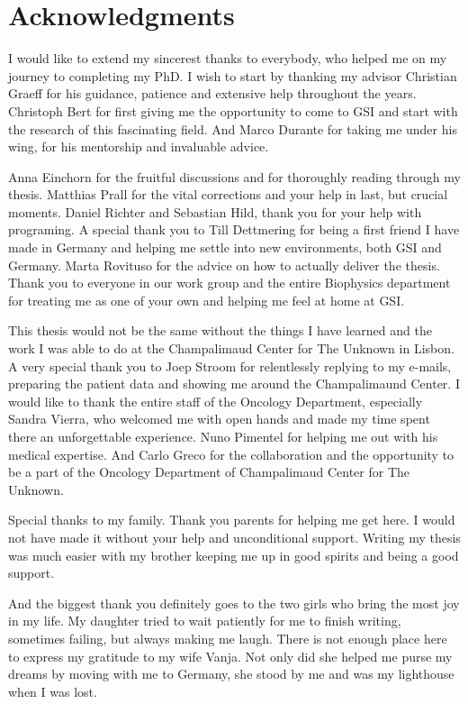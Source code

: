

\chapter*{Acknowledgments}

I would like to extend my sincerest thanks to everybody, who helped me on my journey to completing my PhD.
I wish to start by thanking my advisor Christian Graeff for his guidance, patience and extensive help throughout the years. 
Christoph Bert for first giving me the opportunity to come to GSI and start with the research of this fascinating field. And Marco Durante for taking me under his wing, for his mentorship and invaluable advice.  

Anna Einchorn for the fruitful discussions and for thoroughly reading through my thesis. Matthias Prall for the vital corrections and your help in last, but crucial moments. Daniel Richter and Sebastian Hild, thank you for your help with programing.
A special thank you to Till Dettmering for being a first friend I have made in Germany and helping me settle into new environments, both GSI and Germany. 
Marta Rovituso for the advice on how to actually deliver the thesis. 
Thank you to everyone in our work group and the entire Biophysics department for treating me as one of your own and helping me feel at home at GSI. 

This thesis would not be the same without the things I have learned and the work I was able to do at the Champalimaud Center for The Unknown in Lisbon.
A very special thank you to Joep Stroom for relentlessly replying to my e-mails, preparing the patient data and showing me around the Champalimaund Center.
I would like to thank the entire staff of the Oncology Department, especially Sandra Vierra, who welcomed me with open hands and made my time spent there an unforgettable experience. 
Nuno Pimentel for helping me out with his medical expertise. And Carlo Greco for the collaboration and the opportunity to be a part of the Oncology Department of Champalimaud Center for The Unknown.

Special thanks to my family. Thank you parents for helping me get here. I would not have made it without your help and unconditional support. Writing my thesis was much easier with my brother keeping me up in good spirits
and being a good support.

And the biggest thank you definitely goes to the two girls who bring the most joy in my life. 
My daughter tried to wait patiently for me to finish writing, sometimes failing, but always making me laugh.
There is not enough place here to express my gratitude to my wife Vanja. Not only did she helped me purse my dreams by moving with me to Germany, she stood by me and was my lighthouse when I was lost.



